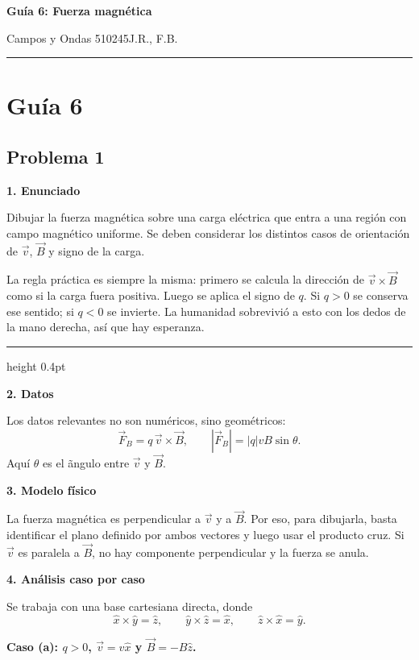 \documentclass[11pt]{article}
\newcommand{\encabezado}[3]{%
{\Large\bfseries #1\par}
\vspace{2pt}
{\normalsize #2\hfill #3\par}
\vspace{6pt}\hrule\vspace{8pt}}
\newcommand{\soluciontitulo}{%
  \par\medskip
  \noindent{\large\bfseries Solución.}\par
  \vspace{0.2em}\hrule height 0.4pt \vspace{0.7em}%
}
\newcommand{\paso}[1]{%
  \par\medskip
  \noindent\textbf{#1}\par
  \vspace{0.1em}%
}
\begin{document}
\encabezado{Guía 6: Fuerza magnética}{Campos y Ondas 510245}{J.R., F.B.}
\shorthandoff{<>}

\section*{Gu\'ia 6}

\subsection*{Problema 1}
\paso{1. Enunciado}
Dibujar la fuerza magn\'etica sobre una carga el\'ectrica que entra a una regi\'on con campo magn\'etico uniforme. Se deben considerar los distintos casos de orientaci\'on de $\vec v$, $\vec B$ y signo de la carga.

\begin{comentario}
La regla pr\'actica es siempre la misma: primero se calcula la direcci\'on de $\vec v\times\vec B$ como si la carga fuera positiva. Luego se aplica el signo de $q$. Si $q>0$ se conserva ese sentido; si $q<0$ se invierte. La humanidad sobrevivi\'o a esto con los dedos de la mano derecha, as\'i que hay esperanza.
\end{comentario}

\soluciontitulo

\paso{2. Datos}
Los datos relevantes no son num\'ericos, sino geom\'etricos:
\begin{equation*}
    \vec F_B=q\,\vec v\times\vec B,
    \qquad
    |\vec F_B|=|q|vB\sin\theta.
\end{equation*}
Aqu\'i $\theta$ es el \~angulo entre $\vec v$ y $\vec B$.

\paso{3. Modelo f\'isico}
La fuerza magn\'etica es perpendicular a $\vec v$ y a $\vec B$. Por eso, para dibujarla, basta identificar el plano definido por ambos vectores y luego usar el producto cruz. Si $\vec v$ es paralela a $\vec B$, no hay componente perpendicular y la fuerza se anula.

\paso{4. An\'alisis caso por caso}
Se trabaja con una base cartesiana directa, donde
\begin{equation*}
    \hat x\times\hat y=\hat z,
    \qquad
    \hat y\times\hat z=\hat x,
    \qquad
    \hat z\times\hat x=\hat y.
\end{equation*}

\textbf{Caso (a): $q>0$, $\vec v=v\hat x$ y $\vec B=-B\hat z$.}
\end{document}
